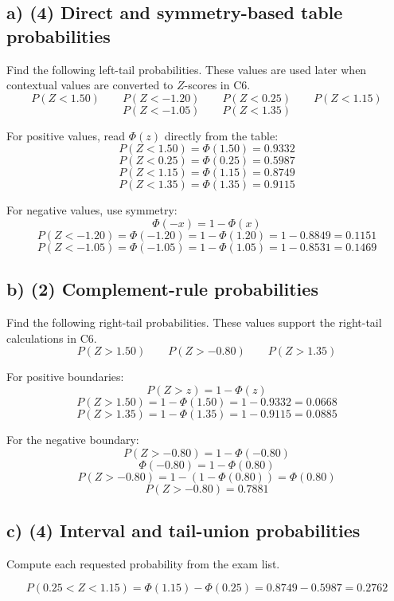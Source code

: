	\subsection*{a) (4) Direct and symmetry-based table probabilities}
	\label{subsec:standard-normal-table-problems-c5-a}
	Find the following left-tail probabilities. These values are used later when contextual values are converted to \(Z\)-scores in C6.
	\[
	P(Z<1.50)
	\qquad
	P(Z<-1.20)
	\qquad
	P(Z<0.25)
	\qquad
	P(Z<1.15)
	\]
	\[
	P(Z<-1.05)
	\qquad
	P(Z<1.35)
	\]
	
	For positive values, read \(\Phi(z)\) directly from the table:
	\[
	P(Z<1.50)=\Phi(1.50)=0.9332
	\]
	\[
	P(Z<0.25)=\Phi(0.25)=0.5987
	\]
	\[
	P(Z<1.15)=\Phi(1.15)=0.8749
	\]
	\[
	P(Z<1.35)=\Phi(1.35)=0.9115
	\]
	
	For negative values, use symmetry:
	\[
	\Phi(-x)=1-\Phi(x)
	\]
	\[
	P(Z<-1.20)=\Phi(-1.20)=1-\Phi(1.20)=1-0.8849=0.1151
	\]
	\[
	P(Z<-1.05)=\Phi(-1.05)=1-\Phi(1.05)=1-0.8531=0.1469
	\]
	
	
	\subsection*{b) (2) Complement-rule probabilities}
	\label{subsec:standard-normal-table-problems-c5-b}
	Find the following right-tail probabilities. These values support the right-tail calculations in C6.
	\[
	P(Z>1.50)
	\qquad
	P(Z>-0.80)
	\qquad
	P(Z>1.35)
	\]
	
	For positive boundaries:
	\[
	P(Z>z)=1-\Phi(z)
	\]
	\[
	P(Z>1.50)=1-\Phi(1.50)=1-0.9332=0.0668
	\]
	\[
	P(Z>1.35)=1-\Phi(1.35)=1-0.9115=0.0885
	\]
	
	For the negative boundary:
	\[
	P(Z>-0.80)=1-\Phi(-0.80)
	\]
	\[
	\Phi(-0.80)=1-\Phi(0.80)
	\]
	\[
	P(Z>-0.80)=1-\left(1-\Phi(0.80)\right)=\Phi(0.80)
	\]
	\[
	P(Z>-0.80)=0.7881
	\]
	
	
	\subsection*{c) (4) Interval and tail-union probabilities}
\label{subsec:standard-normal-table-problems-c5-c}
Compute each requested probability from the exam list.

\[
P(0.25<Z<1.15)=\Phi(1.15)-\Phi(0.25)=0.8749-0.5987=0.2762
\]

